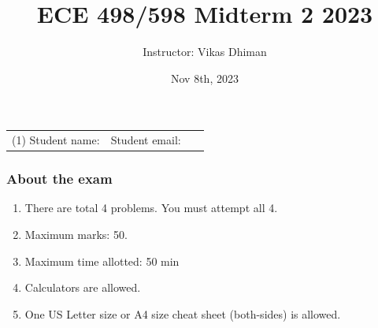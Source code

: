 \documentclass{article}
\title{ECE 498/598 Midterm 2 2023}
\date{Nov 8th, 2023}
\author{Instructor: Vikas Dhiman}
\begin{document}
\maketitle

\begin{tabular}{p{0.5\linewidth}p{0.5\linewidth}}
  (1) Student name:& Student email: \\
\end{tabular}

\subsubsection*{About the exam}
\begin{enumerate}
  \item There are total 4 problems. You must attempt all 4.
  \item Maximum marks: 50.
  \item Maximum time allotted:  50 min
  \item Calculators are allowed.
  \item One US Letter size or A4 size cheat sheet (both-sides) is allowed.
\end{enumerate}
\end{document}
